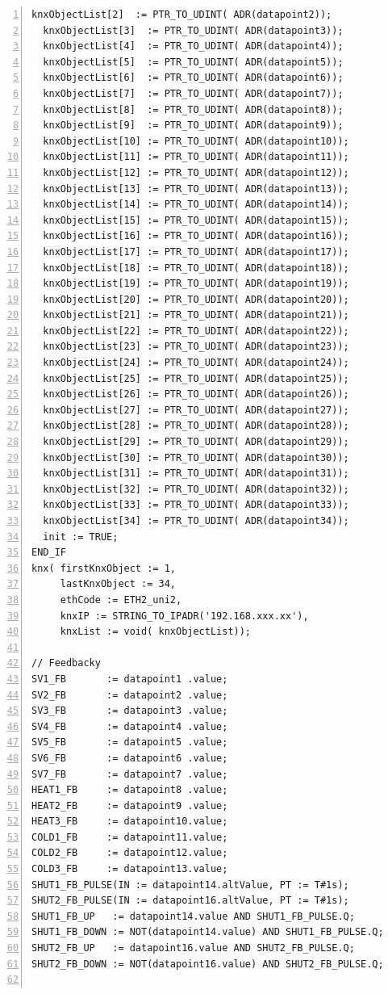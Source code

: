 \begin{lstlisting}[language=ST, breaklines=true, numbers=left, numberstyle=\small, numbersep=10pt, frame=single, basicstyle=\ttfamily\small, caption={Program komunikace mezi PLC a KNX}, label={lst:prgKNXComm}]
  knxObjectList[2]  := PTR_TO_UDINT( ADR(datapoint2));   
  knxObjectList[3]  := PTR_TO_UDINT( ADR(datapoint3));   
  knxObjectList[4]  := PTR_TO_UDINT( ADR(datapoint4));   
  knxObjectList[5]  := PTR_TO_UDINT( ADR(datapoint5));   
  knxObjectList[6]  := PTR_TO_UDINT( ADR(datapoint6));   
  knxObjectList[7]  := PTR_TO_UDINT( ADR(datapoint7));   
  knxObjectList[8]  := PTR_TO_UDINT( ADR(datapoint8));   
  knxObjectList[9]  := PTR_TO_UDINT( ADR(datapoint9));   
  knxObjectList[10] := PTR_TO_UDINT( ADR(datapoint10));  
  knxObjectList[11] := PTR_TO_UDINT( ADR(datapoint11));  
  knxObjectList[12] := PTR_TO_UDINT( ADR(datapoint12));  
  knxObjectList[13] := PTR_TO_UDINT( ADR(datapoint13));  
  knxObjectList[14] := PTR_TO_UDINT( ADR(datapoint14));  
  knxObjectList[15] := PTR_TO_UDINT( ADR(datapoint15));  
  knxObjectList[16] := PTR_TO_UDINT( ADR(datapoint16));  
  knxObjectList[17] := PTR_TO_UDINT( ADR(datapoint17));  
  knxObjectList[18] := PTR_TO_UDINT( ADR(datapoint18));  
  knxObjectList[19] := PTR_TO_UDINT( ADR(datapoint19));  
  knxObjectList[20] := PTR_TO_UDINT( ADR(datapoint20));  
  knxObjectList[21] := PTR_TO_UDINT( ADR(datapoint21));  
  knxObjectList[22] := PTR_TO_UDINT( ADR(datapoint22));  
  knxObjectList[23] := PTR_TO_UDINT( ADR(datapoint23));  
  knxObjectList[24] := PTR_TO_UDINT( ADR(datapoint24));  
  knxObjectList[25] := PTR_TO_UDINT( ADR(datapoint25));  
  knxObjectList[26] := PTR_TO_UDINT( ADR(datapoint26));  
  knxObjectList[27] := PTR_TO_UDINT( ADR(datapoint27));  
  knxObjectList[28] := PTR_TO_UDINT( ADR(datapoint28));  
  knxObjectList[29] := PTR_TO_UDINT( ADR(datapoint29));  
  knxObjectList[30] := PTR_TO_UDINT( ADR(datapoint30));    
  knxObjectList[31] := PTR_TO_UDINT( ADR(datapoint31));
  knxObjectList[32] := PTR_TO_UDINT( ADR(datapoint32));  
  knxObjectList[33] := PTR_TO_UDINT( ADR(datapoint33));    
  knxObjectList[34] := PTR_TO_UDINT( ADR(datapoint34));   
  init := TRUE;
END_IF
knx( firstKnxObject := 1,
     lastKnxObject := 34,
     ethCode := ETH2_uni2,
     knxIP := STRING_TO_IPADR('192.168.xxx.xx'),
     knxList := void( knxObjectList));

// Feedbacky
SV1_FB       := datapoint1 .value;
SV2_FB       := datapoint2 .value;
SV3_FB       := datapoint3 .value;
SV4_FB       := datapoint4 .value;
SV5_FB       := datapoint5 .value;
SV6_FB       := datapoint6 .value;
SV7_FB       := datapoint7 .value;
HEAT1_FB     := datapoint8 .value;
HEAT2_FB     := datapoint9 .value;
HEAT3_FB     := datapoint10.value;
COLD1_FB     := datapoint11.value;
COLD2_FB     := datapoint12.value;
COLD3_FB     := datapoint13.value;
SHUT1_FB_PULSE(IN := datapoint14.altValue, PT := T#1s);
SHUT2_FB_PULSE(IN := datapoint16.altValue, PT := T#1s);
SHUT1_FB_UP   := datapoint14.value AND SHUT1_FB_PULSE.Q;
SHUT1_FB_DOWN := NOT(datapoint14.value) AND SHUT1_FB_PULSE.Q;
SHUT2_FB_UP   := datapoint16.value AND SHUT2_FB_PULSE.Q;
SHUT2_FB_DOWN := NOT(datapoint16.value) AND SHUT2_FB_PULSE.Q;


\end{lstlisting}
